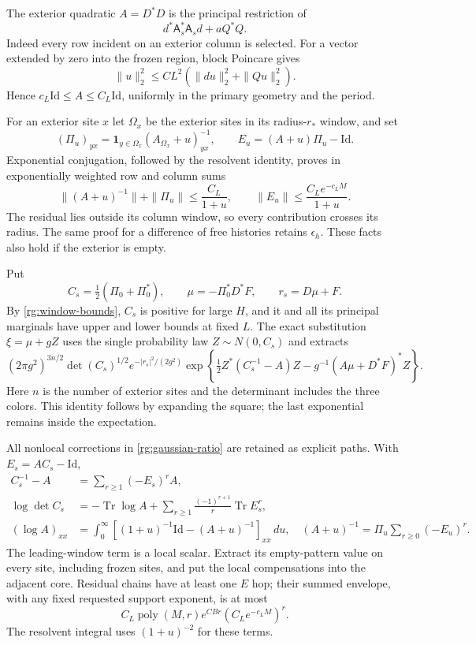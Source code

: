 The exterior quadratic $A=D^*D$ is the principal restriction of
\[
 d^*\mathsf A_s^*\mathsf A_s d+aQ^*Q.
\]
Indeed every row incident on an exterior column is selected.
For a vector extended by zero into the frozen region, block Poincare
gives
\[
 \|u\|_2^2\le CL^2(\|du\|_2^2+\|Qu\|_2^2).
\]
Hence $c_L\mathrm{Id}\le A\le C_L\mathrm{Id}$, uniformly in the
primary geometry and the period.

For an exterior site $x$ let $\Omega_x$ be the exterior sites in its
radius-$r_*$ window, and set
\[
 (\Pi_u)_{yx}=\mathbf1_{y\in\Omega_x}
                        (A_{\Omega_x}+u)^{-1}_{yx},\qquad
 E_u=(A+u)\Pi_u-\mathrm{Id}.
\]
Exponential conjugation, followed by the resolvent identity, proves
in exponentially weighted row and column sums
\begin{equation}
 \|(A+u)^{-1}\|+\|\Pi_u\|\le\frac{C_L}{1+u},\qquad
 \|E_u\|\le\frac{C_Le^{-c_LM}}{1+u}.
 \label{rg:window-bounds}
\end{equation}
The residual lies outside its column window, so every contribution
crosses its radius.  The same proof for a difference of free histories
retains $\epsilon_h$.  These facts also hold if the exterior is empty.

Put
\[
 C_s=\tfrac12(\Pi_0+\Pi_0^*),\qquad
 \mu=-\Pi_0^*D^*F,\qquad r_s=D\mu+F.
\]
By \eqref{rg:window-bounds}, $C_s$ is positive for large $H$, and
it and all its principal marginals have upper and lower bounds at
fixed $L$.  The exact substitution $\xi=\mu+gZ$ uses the single
probability law $Z\sim N(0,C_s)$ and extracts
\begin{equation}
 (2\pi g^2)^{3n/2}\det(C_s)^{1/2}e^{-|r_s|^2/(2g^2)}
 \exp\left\{\tfrac12Z^*(C_s^{-1}-A)Z
                     -g^{-1}(A\mu+D^*F)^*Z\right\}.
 \label{rg:gaussian-ratio}
\end{equation}
Here $n$ is the number of exterior sites and the determinant includes
the three colors.  This identity follows by expanding the square;
the last exponential remains inside the expectation.

All nonlocal corrections in \eqref{rg:gaussian-ratio} are retained
as explicit paths.  With $E_s=AC_s-\mathrm{Id}$,
\begin{align}
 C_s^{-1}-A&=\sum_{r\ge1}(-E_s)^rA,\nonumber\\
 \log\det C_s&=-\operatorname{Tr}\log A+
           \sum_{r\ge1}\frac{(-1)^{r+1}}r\operatorname{Tr}E_s^r,
 \label{rg:ratio-series}\\
 (\log A)_{xx}&=\int_0^\infty
       [(1+u)^{-1}\mathrm{Id}-(A+u)^{-1}]_{xx}\,du,
 \quad (A+u)^{-1}=\Pi_u\sum_{r\ge0}(-E_u)^r.
 \nonumber
\end{align}
The leading-window term is a local scalar.  Extract its empty-pattern
value on every site, including frozen sites, and put the local
compensations into the adjacent core.  Residual chains have at least
one $E$ hop; their summed envelope, with any fixed requested support
exponent, is at most
\begin{equation}
 C_L\operatorname{poly}(M,r)
              e^{C B r}(C_Le^{-c_LM})^r.
 \label{rg:chain-price}
\end{equation}
The resolvent integral uses $(1+u)^{-2}$ for these terms.


